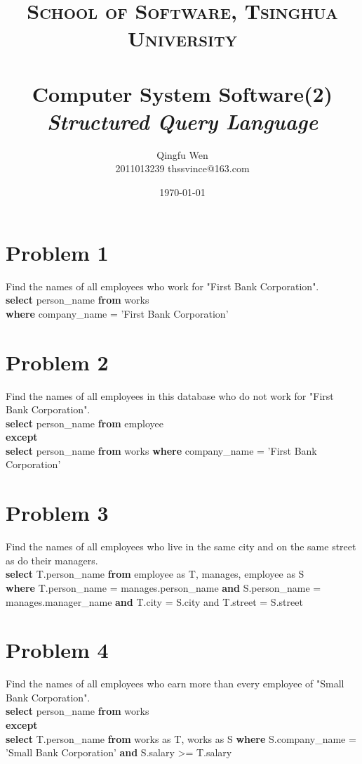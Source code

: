 \documentclass[paper=a4, fontsize=11pt]{scrartcl} %
\title{	
\normalfont \normalsize
\textsc{School of Software, Tsinghua University} \\ [25pt] %
\horrule{0.5pt} \\[0.4cm] %
\huge Computer System Software(2)\\ %
\LARGE\textit{Structured Query Language}
\horrule{2pt} \\[0.5cm] %
}
\author{Qingfu Wen \\ \normalsize 2011013239 thssvince@163.com} %
\date{\normalsize\today} %
\numberwithin{equation}{section} %
\numberwithin{figure}{section} %
\numberwithin{table}{section} %
\begin{document}
\maketitle %
\newpage

\section{Problem 1}
Find the names of all employees who work for "First Bank Corporation".\\
\textbf{select} person\_name \textbf{from} works \\
\textbf{where} company\_name = 'First Bank Corporation'
\section{Problem 2}
Find the names of all employees in this database who do not work for "First Bank Corporation".\\
\textbf{select} person\_name \textbf{from} employee\\
\textbf{except}\\
\textbf{select} person\_name \textbf{from} works \textbf{where} company\_name = 'First Bank Corporation'
\section{Problem 3}
Find the names of all employees who live in the same city and on the same street as do their managers.\\
\textbf{select} T.person\_name \textbf{from} employee as T, manages, employee as S \\
\textbf{where} T.person\_name = manages.person\_name \textbf{and}  S.person\_name = manages.manager\_name \textbf{and} T.city = S.city and T.street = S.street
\section{Problem 4}
Find the names of all employees who earn more than every employee of "Small Bank Corporation".\\
\textbf{select} person\_name \textbf{from} works  \\
\textbf{except} \\
\textbf{select} T.person\_name \textbf{from} works as T, works as S \textbf{where} S.company\_name = 'Small Bank Corporation' \textbf{and} S.salary >= T.salary
\end{document}
